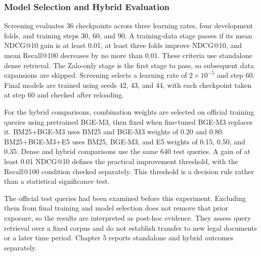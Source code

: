 \subsubsection{Model Selection and Hybrid Evaluation}

Screening evaluates 36 checkpoints across three learning rates, four development folds, and training steps 30, 60, and 90. A training-data stage passes if its mean NDCG@10 gain is at least 0.01, at least three folds improve NDCG@10, and mean Recall@100 decreases by no more than 0.01. These criteria use standalone dense retrieval. The Zalo-only stage is the first stage to pass, so subsequent data expansions are skipped. Screening selects a learning rate of \(2\times10^{-5}\) and step 60. Final models are trained using seeds 42, 43, and 44, with each checkpoint taken at step 60 and checked after reloading.

For the hybrid comparisons, combination weights are selected on official training queries using pretrained BGE-M3, then fixed when fine-tuned BGE-M3 replaces it. BM25+BGE-M3 uses BM25 and BGE-M3 weights of 0.20 and 0.80. BM25+BGE-M3+E5 uses BM25, BGE-M3, and E5 weights of 0.15, 0.50, and 0.35. Dense and hybrid comparisons use the same 640 test queries. A gain of at least 0.01 NDCG@10 defines the practical improvement threshold, with the Recall@100 condition checked separately. This threshold is a decision rule rather than a statistical significance test.

The official test queries had been examined before this experiment. Excluding them from final training and model selection does not remove that prior exposure, so the results are interpreted as post-hoc evidence. They assess query retrieval over a fixed corpus and do not establish transfer to new legal documents or a later time period. Chapter 5 reports standalone and hybrid outcomes separately.
